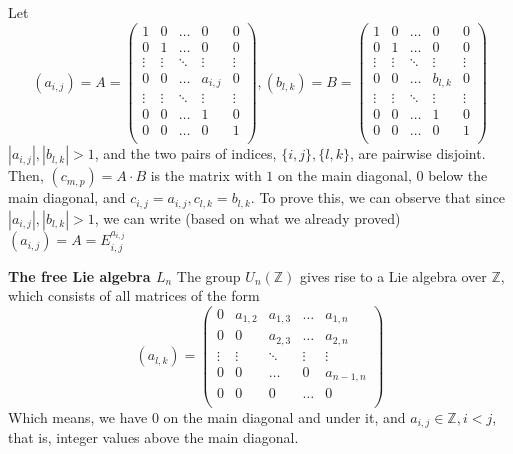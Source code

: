 \documentclass[12pt]{article}
\begin{document}
Let
$$
(a_{i,j})=A=\begin{pmatrix} 
	1 & 0 & \dots & 0 & 0 \\
	0 & 1 & \dots & 0 & 0 \\
	\vdots & \vdots & \ddots & \vdots & \vdots \\
	0 & 0 & \dots & a_{i,j} & 0 \\
	\vdots & \vdots & \ddots & \vdots & \vdots \\
	0 & 0 & \dots & 1 & 0 \\
	0 & 0 & \dots & 0 & 1 \\
\end{pmatrix},
(b_{l,k})=B=\begin{pmatrix} 
	1 & 0 & \dots & 0 & 0 \\
	0 & 1 & \dots & 0 & 0 \\
	\vdots & \vdots & \ddots & \vdots & \vdots \\
	0 & 0 & \dots & b_{l,k} & 0 \\
	\vdots & \vdots & \ddots & \vdots & \vdots \\
	0 & 0 & \dots & 1 & 0 \\
	0 & 0 & \dots & 0 & 1 \\
\end{pmatrix}
$$
\( |a_{i,j}|,|b_{l,k}|>1 \), and the two pairs of indices, \( \{i,j\},\{l,k\} \), are pairwise disjoint. \newline
Then, \( (c_{m,p})=A \cdot B \) is the matrix with \( 1 \) on the main diagonal, \( 0 \) below the main diagonal,\newline
and \( c_{i,j}=a_{i,j},c_{l,k}=b_{l,k} \). \newline
To prove this, we can observe that since \( |a_{i,j}|,|b_{l,k}|>1 \), we can write (based on what we already proved) \newline
\( (a_{i,j})=A=E_{i,j}^{a_{i,j}} \)


\textbf{The free Lie algebra \( L_{n}\)} \newline
The group \( U_{n}(\mathbb{Z}) \) gives rise to a Lie algebra over \( \mathbb{Z} \), \newline
which consists of all matrices of the form $$ (a_{l,k})=\begin{pmatrix} 
	0 & a_{1,2} & a_{1,3} & \dots & a_{1,n} \\
	0 & 0 & a_{2,3} & \dots & a_{2,n} \\
	\vdots & \vdots & \ddots & \vdots & \vdots \\
	0 & 0 & \dots & 0 & a_{n-1,n} \\
	0 & 0 & 0 & \dots & 0 \\
\end{pmatrix} 
$$
Which means, we have \( 0 \) on the main diagonal and under it, and \( a_{i,j} \in \mathbb{Z},i<j \),
that is, integer values above the main diagonal. \newline
\end{document}
